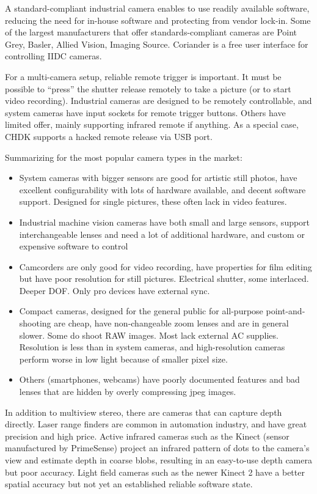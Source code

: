 A standard-compliant industrial camera enables to use readily available software, reducing the need for in-house software and protecting from vendor lock-in.
Some of the largest manufacturers that offer standards-compliant cameras are Point Grey, Basler, Allied Vision, Imaging Source.
Coriander \cite{coriander} is a free user interface for controlling IIDC cameras.

For a multi-camera setup, reliable remote trigger is important.
It must be possible to ``press'' the shutter release remotely to take a picture (or to start video recording).
Industrial cameras are designed to be remotely controllable, and system cameras have input sockets for remote trigger buttons.
Others have limited offer, mainly supporting infrared remote if anything.
As a special case, CHDK supports a hacked remote release via USB port.


Summarizing for the most popular camera types in the market:

\begin{itemize}
	\item System cameras with bigger sensors are good for artistic still photos, have excellent configurability with lots of hardware available, and decent software support. Designed for single pictures, these often lack in video features.
	\item Industrial machine vision cameras have both small and large sensors, support interchangeable lenses and need a lot of additional hardware, and custom or expensive software to control
	\item Camcorders are only good for video recording, have properties for film editing but have poor resolution for still pictures. Electrical shutter, some interlaced. Deeper DOF. Only pro devices have external sync.
	\item Compact cameras, designed for the general public for all-purpose point-and-shooting are cheap, have non-changeable zoom lenses and are in general slower. Some do shoot RAW images. Most lack external AC supplies. Resolution is less than in system cameras, and high-resolution cameras perform worse in low light because of smaller pixel size.
	\item Others (smartphones, webcams) have poorly documented features and bad lenses that are hidden by overly compressing jpeg images.
\end{itemize}

In addition to multiview stereo, there are cameras that can capture depth directly.
Laser range finders are common in automation industry, and have great precision and high price.
Active infrared cameras such as the Kinect (sensor manufactured by PrimeSense) project an infrared pattern of dots to the camera's view and estimate depth in coarse blobs, resulting in an easy-to-use depth camera but poor accuracy.
Light field cameras such as the newer Kinect 2 have a better spatial accuracy but not yet an established reliable software state.

